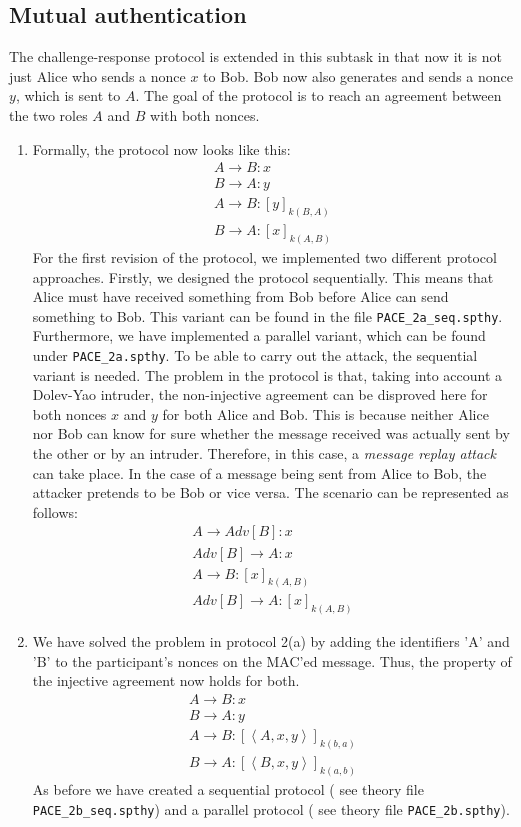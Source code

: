 \documentclass[a4paper,11pt]{scrartcl}
\newcommand{\tuple}[1]{\left\langle #1\right\rangle}
\begin{document}
\subsection{Mutual authentication}
The challenge-response protocol is extended in this subtask in that now it is not just Alice who sends a nonce $x$ to Bob.  Bob now also generates and sends a nonce $y$,  which is sent to $A$. The goal of the protocol is to reach an agreement between the two roles $A$ and $B$ with both nonces. 
\begin{enumerate}[label=\alph*)]
	\item Formally, the protocol now looks like this:
\begin{align*}
A \rightarrow B: x\\
B \rightarrow A: y\\
A \rightarrow B: [y]_{k(B,A)}\\
B \rightarrow A: [x]_{k(A,B)}
\end{align*}
For the first revision of the protocol, we implemented two different protocol approaches.  Firstly,  we designed the protocol sequentially.  This means that Alice must have received something from Bob before Alice can send something to Bob.  This variant can be found in the file \texttt{PACE_2a_seq.spthy}. Furthermore,  we have implemented a parallel variant,  which can be found under \texttt{PACE_2a.spthy}. To be able to carry out the attack, the sequential variant is needed.  \newline
The problem in the protocol is that,  taking into account a Dolev-Yao intruder,  the non-injective agreement can be disproved here for both nonces $x$ and $y$ for both 		Alice and Bob. This is because neither Alice nor Bob can know for sure whether the message received was actually sent by the other or by an intruder.  Therefore, in this case,  a \textit{message replay attack} can take place.  In the case of a message being sent from Alice to Bob,  the attacker pretends to be Bob or vice versa.  The scenario can be represented as follows:
	\begin{align*}
	A \rightarrow Adv[B]: x\\
	Adv[B] \rightarrow A: x\\
	A \rightarrow B : [x]_{k(A,B)}\\
	Adv[B] \rightarrow A: [x]_{k(A,B)}
	\end{align*}
	\item We have solved the problem in protocol 2(a) by adding the identifiers 'A' and 'B' to the participant's nonces on the MAC'ed message.  Thus, the property of the 			injective agreement now holds for both.
	\begin{align*}
	A \rightarrow B: x\\
	B \rightarrow A: y\\
	A \rightarrow B: [\tuple{A, x, y}]_{k(b,a)}\\
	B \rightarrow A: [\tuple{B, x, y}]_{k(a,b)}
	\end{align*}
	As before we have created a sequential protocol ( see theory file \texttt{PACE_2b_seq.spthy}) and a parallel protocol ( see theory file \texttt{PACE_2b.spthy}).
\end{enumerate}
\end{document}
